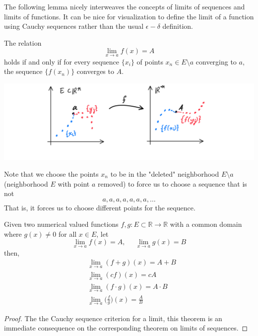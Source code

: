 \documentclass{article}
\begin{document}
    The following lemma nicely interweaves the concepts of limits of sequences and limits of functions. It can be nice for visualization to define the limit of a function using Cauchy sequences rather than the usual $\epsilon-\delta$ definition. 

    \begin{lemma}
      The relation 
      \[\lim_{x \rightarrow a} f(x) = A\]
      holds if and only if for every sequence $\{x_i\}$ of points $x_n \in E \setminus a$ converging to $a$, the sequence $\{f(x_n)\}$ converges to $A$. 
      \begin{center}
          \includegraphics[scale=0.25]{img/Cauchy_Criterion_of_Limit_of_Function.PNG}
      \end{center}
      Note that we choose the points $x_n$ to be in the "deleted" neighborhood $E\setminus a$ (neighborhood $E$ with point $a$ removed) to force us to choose a sequence that is not
      \[a, a, a, a, a, a, a, \ldots\]
      That is, it forces us to choose different points for the sequence. 
    \end{lemma}

    \begin{theorem}
    Given two numerical valued functions $f, g: E \subset \mathbb{R} \longrightarrow \mathbb{R}$ with a common domain where $g(x) \neq 0$ for all $x \in E$, let 
    \[\lim_{x \rightarrow a} f(x) = A, \;\;\;\;\; \lim_{x \rightarrow a} g(x) = B\]
    then, 
    \begin{align*}
        & \lim_{x \rightarrow a} (f+g)(x) = A + B \\
        & \lim_{x \rightarrow a} (cf)(x) = cA \\
        & \lim_{x \rightarrow a} (f \cdot g)(x) = A \cdot B \\
        & \lim_{x \rightarrow a} \bigg(\frac{f}{g}\bigg) (x) = \frac{A}{B}
    \end{align*}
    \end{theorem}
    \begin{proof}
    The the Cauchy sequence criterion for a limit, this theorem is an immediate consequence on the corresponding theorem on limits of sequences.
    \end{proof}
\end{document}
